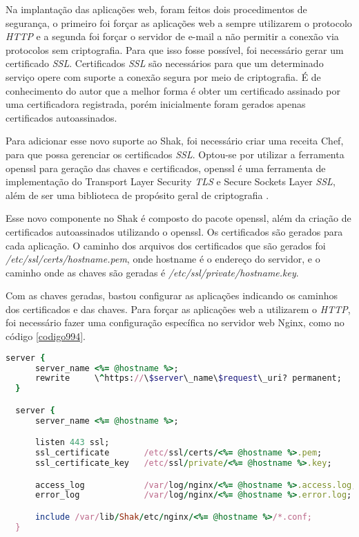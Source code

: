 Na implantação das aplicações web, foram feitos dois procedimentos de segurança, o primeiro
foi forçar as aplicações web a sempre utilizarem o protocolo \textit{HTTP} e a segunda foi forçar o
servidor de e-mail a não permitir a conexão via protocolos sem criptografia. Para que 
isso fosse possível, foi necessário gerar um certificado \textit{SSL}. Certificados 
\textit{SSL} são necessários para que um determinado serviço opere com suporte 
a conexão segura por meio de criptografia.
É de conhecimento do autor que a melhor forma é obter um certificado assinado
por uma certificadora registrada, porém inicialmente foram gerados apenas certificados
autoassinados.

Para adicionar esse novo suporte ao Shak, foi necessário criar uma receita Chef,
para que possa gerenciar os certificados \textit{SSL}. Optou-se por utilizar a ferramenta
openssl para geração das chaves e certificados, openssl é uma ferramenta de
implementação do Transport Layer Security \textit{TLS} e Secure Sockets Layer \textit{SSL},
além de ser uma biblioteca de propósito geral de criptografia \cite{openssl}.

Esse novo componente no Shak é composto do pacote openssl, além da criação
de certificados autoassinados utilizando o openssl. Os certificados são gerados 
para cada aplicação. O caminho dos arquivos dos certificados que 
são gerados foi \textit{/etc/ssl/certs/hostname.pem}, onde hostname é o endereço 
do servidor,
e o caminho onde as chaves são geradas é \textit{/etc/ssl/private/hostname.key}.

Com as chaves geradas, bastou configurar as aplicações indicando os caminhos dos certificados
e das chaves. Para forçar as aplicações web a utilizarem o \textit{HTTP}, foi necessário fazer
uma configuração específica no servidor web Nginx, como no código \ref{codigo994}.

\begin{lstlisting}[language=Ruby,label=dice_index,caption={Exemplo de arquivo de configuração do Nginx para aplicações web no shak}, label=codigo994]
  server {
      server_name <%= @hostname %>;
      rewrite     \^https://\$server\_name\$request\_uri? permanent;
  }

  server {
      server_name <%= @hostname %>;

      listen 443 ssl;
      ssl_certificate       /etc/ssl/certs/<%= @hostname %>.pem;
      ssl_certificate_key   /etc/ssl/private/<%= @hostname %>.key;

      access_log            /var/log/nginx/<%= @hostname %>.access.log;
      error_log             /var/log/nginx/<%= @hostname %>.error.log;

      include /var/lib/Shak/etc/nginx/<%= @hostname %>/*.conf;
  }
\end{lstlisting}

